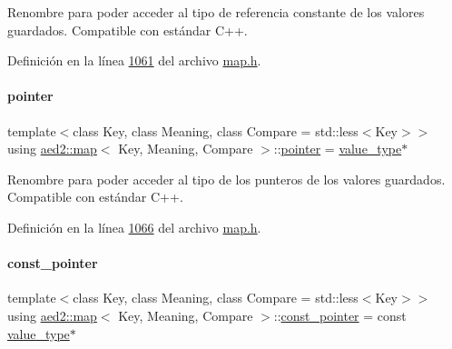 Renombre para poder acceder al tipo de referencia constante de los valores guardados. Compatible con estándar C++. 



Definición en la línea \hyperlink{map_8h_source_l01061}{1061} del archivo \hyperlink{map_8h_source}{map.\+h}.

\mbox{\label{classaed2_1_1map_a7394e98a23b86bc008ad73326b273fd5_a7394e98a23b86bc008ad73326b273fd5}} 
\paragraph{\texorpdfstring{pointer}{pointer}}
{\footnotesize\ttfamily template$<$class Key, class Meaning, class Compare = std\+::less$<$\+Key$>$$>$ \\
using \hyperlink{classaed2_1_1map}{aed2\+::map}$<$ Key, Meaning, Compare $>$\+::\hyperlink{classaed2_1_1map_a7394e98a23b86bc008ad73326b273fd5_a7394e98a23b86bc008ad73326b273fd5}{pointer} =  \hyperlink{classaed2_1_1map_a719db98e0ff9a837610f76be33264680_a719db98e0ff9a837610f76be33264680}{value\+\_\+type}$\ast$}



Renombre para poder acceder al tipo de los punteros de los valores guardados. Compatible con estándar C++. 



Definición en la línea \hyperlink{map_8h_source_l01066}{1066} del archivo \hyperlink{map_8h_source}{map.\+h}.

\mbox{\label{classaed2_1_1map_a1366fc3e227a49777cb748fc6d4e022b_a1366fc3e227a49777cb748fc6d4e022b}} 
\paragraph{\texorpdfstring{const\+\_\+pointer}{const\_pointer}}
{\footnotesize\ttfamily template$<$class Key, class Meaning, class Compare = std\+::less$<$\+Key$>$$>$ \\
using \hyperlink{classaed2_1_1map}{aed2\+::map}$<$ Key, Meaning, Compare $>$\+::\hyperlink{classaed2_1_1map_a1366fc3e227a49777cb748fc6d4e022b_a1366fc3e227a49777cb748fc6d4e022b}{const\+\_\+pointer} =  const \hyperlink{classaed2_1_1map_a719db98e0ff9a837610f76be33264680_a719db98e0ff9a837610f76be33264680}{value\+\_\+type}$\ast$}



